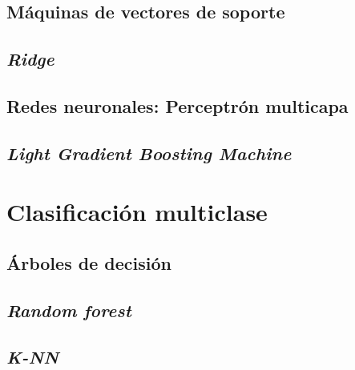 

\subsection{Máquinas de vectores de soporte}
\label{subsec:svm_bin}



\subsection{\textit{Ridge}}
\label{subsec:ridge_bin}



\subsection{Redes neuronales: Perceptrón multicapa}
\label{subsec:mlp_bin}



\subsection{\textit{Light Gradient Boosting Machine}}
\label{subsec:lgbm_bin}



\section{Clasificación multiclase}
\label{sec:clas_multi}

\subsection{Árboles de decisión}
\label{subsec:dt_multi}



\subsection{\textit{Random forest}}
\label{subsec:rf_multi}



\subsection{\textit{K-NN}}
\label{subsec:knn_multi}

